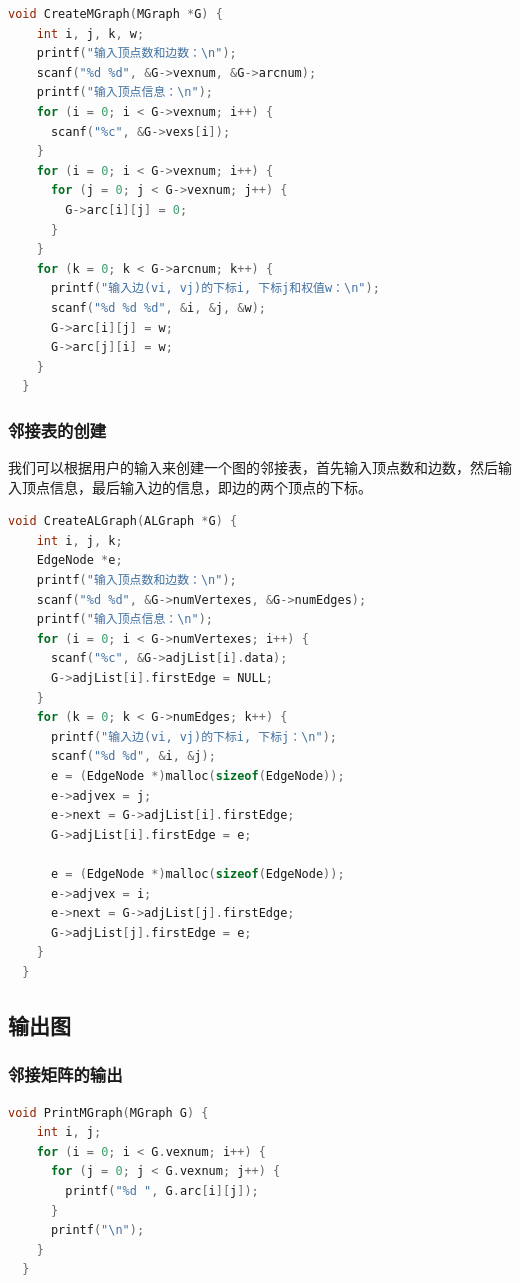 \documentclass[lang=cn,newtx,10pt,scheme=chinese]{elegantbook}
\begin{document}
\begin{lstlisting}[language=C++, caption={邻接矩阵的创建}]
  void CreateMGraph(MGraph *G) {
    int i, j, k, w;
    printf("输入顶点数和边数：\n");
    scanf("%d %d", &G->vexnum, &G->arcnum);
    printf("输入顶点信息：\n");
    for (i = 0; i < G->vexnum; i++) {
      scanf("%c", &G->vexs[i]);
    }
    for (i = 0; i < G->vexnum; i++) {
      for (j = 0; j < G->vexnum; j++) {
        G->arc[i][j] = 0;
      }
    }
    for (k = 0; k < G->arcnum; k++) {
      printf("输入边(vi, vj)的下标i, 下标j和权值w：\n");
      scanf("%d %d %d", &i, &j, &w);
      G->arc[i][j] = w;
      G->arc[j][i] = w;
    }
  }
\end{lstlisting}

\subsubsection{邻接表的创建}

我们可以根据用户的输入来创建一个图的邻接表，首先输入顶点数和边数，然后输入顶点信息，最后输入边的信息，即边的两个顶点的下标。
\begin{lstlisting}[language=C++, caption={邻接表的创建}]
  void CreateALGraph(ALGraph *G) {
    int i, j, k;
    EdgeNode *e;
    printf("输入顶点数和边数：\n");
    scanf("%d %d", &G->numVertexes, &G->numEdges);
    printf("输入顶点信息：\n");
    for (i = 0; i < G->numVertexes; i++) {
      scanf("%c", &G->adjList[i].data);
      G->adjList[i].firstEdge = NULL;
    }
    for (k = 0; k < G->numEdges; k++) {
      printf("输入边(vi, vj)的下标i, 下标j：\n");
      scanf("%d %d", &i, &j);
      e = (EdgeNode *)malloc(sizeof(EdgeNode));
      e->adjvex = j;
      e->next = G->adjList[i].firstEdge;
      G->adjList[i].firstEdge = e;

      e = (EdgeNode *)malloc(sizeof(EdgeNode));
      e->adjvex = i;
      e->next = G->adjList[j].firstEdge;
      G->adjList[j].firstEdge = e;
    }
  }

\end{lstlisting}

\subsection{输出图}

\subsubsection{邻接矩阵的输出}

\begin{lstlisting}[language=C++, caption={邻接矩阵的输出}]
  void PrintMGraph(MGraph G) {
    int i, j;
    for (i = 0; i < G.vexnum; i++) {
      for (j = 0; j < G.vexnum; j++) {
        printf("%d ", G.arc[i][j]);
      }
      printf("\n");
    }
  }
\end{lstlisting}
\end{document}
